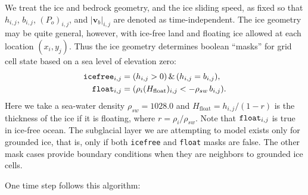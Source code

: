 \documentclass[11pt,final]{amsart}
\newcommand\bv{\mathbf{v}}
\begin{document}
We treat the ice and bedrock geometry, and the ice sliding speed, as fixed so that $h_{i,j}$, $b_{i,j}$, $(P_o)_{i,j}$, and $|\bv_b|_{i,j}$ are denoted as time-independent.  The ice geometry may be quite general, however, with ice-free land and floating ice allowed at each location $(x_i,y_j)$.  Thus the ice geometry determines boolean ``masks'' for grid cell state based on a sea level of elevation zero:
\begin{align*}
\text{\texttt{icefree}}_{i,j} &= (h_{i,j} > 0)\, \&\, (h_{i,j} = b_{i,j}), \\
\text{\texttt{float}}_{i,j}   &= (\rho_i (H_{\text{float}})_{i,j} < - \rho_{sw}\, b_{i,j}).
\end{align*}
Here we take a sea-water density $\rho_{sw}=1028.0$ and $H_{\text{float}}=h_{i,j} / (1 - r)$  is the thickness of the ice if it is floating, where $r=\rho_i / \rho_{sw}$.  Note that $\text{\texttt{float}}_{i,j}$ is true in ice-free ocean.  The subglacial layer we are attempting to model exists only for grounded ice, that is, only if both \texttt{icefree} and \texttt{float} masks are false.  The other mask cases provide boundary conditions when they are neighbors to grounded ice cells.

One time step follows this algorithm:
\end{document}

